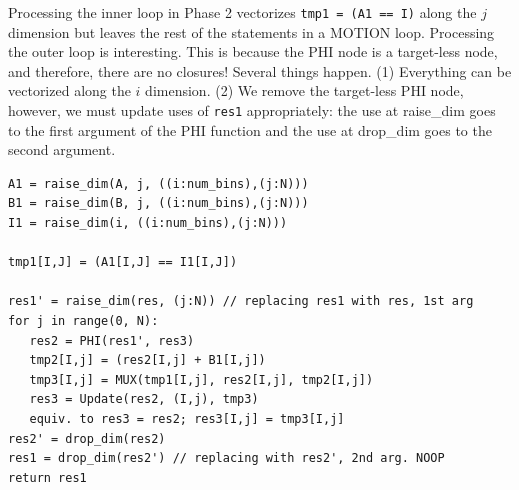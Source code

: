 \documentclass[sigconf, screen, natbib=false, dvipsnames, table]{acmart}
\theoremstyle{definition}
\begin{document}
Processing the inner loop in Phase 2 vectorizes \texttt{tmp1 = (A1 == I)} along the $j$ dimension but leaves the rest of the statements in a MOTION loop. Processing the outer loop is interesting. This is because the PHI node is a target-less node, and therefore, there are no closures! Several things happen. (1) Everything can be vectorized along the $i$ dimension. (2) We remove the target-less PHI node, however, we must update uses of \texttt{res1} appropriately: the use at raise\_dim goes to the first argument of the PHI function and the use at drop\_dim goes to the second argument.

{\small
\begin{verbatim}
A1 = raise_dim(A, j, ((i:num_bins),(j:N)))
B1 = raise_dim(B, j, ((i:num_bins),(j:N)))
I1 = raise_dim(i, ((i:num_bins),(j:N)))

tmp1[I,J] = (A1[I,J] == I1[I,J])

res1' = raise_dim(res, (j:N)) // replacing res1 with res, 1st arg
for j in range(0, N):
   res2 = PHI(res1', res3)
   tmp2[I,j] = (res2[I,j] + B1[I,j])
   tmp3[I,j] = MUX(tmp1[I,j], res2[I,j], tmp2[I,j])
   res3 = Update(res2, (I,j), tmp3)
   equiv. to res3 = res2; res3[I,j] = tmp3[I,j]
res2' = drop_dim(res2)   
res1 = drop_dim(res2') // replacing with res2', 2nd arg. NOOP
return res1
\end{verbatim}
}

\end{document}
